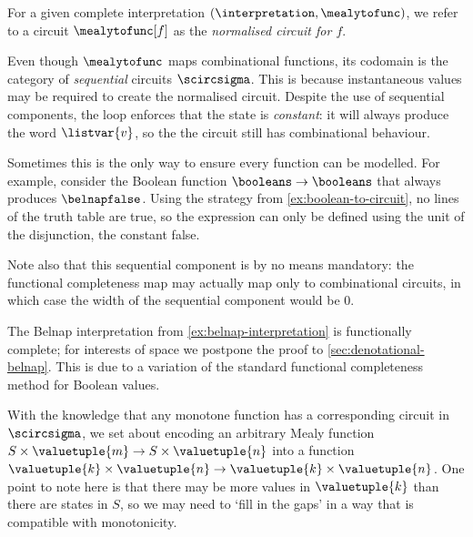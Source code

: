 For a given complete interpretation \((\interpretation,\mealytofunc)\), we refer
to a circuit \(\mealytofunc[f]\) as the \emph{normalised circuit for \(f\)}.\

\begin{remark}
    Even though \(\mealytofunc\) maps combinational functions, its codomain is
    the category of \emph{sequential} circuits \(\scircsigma\).
    This is because instantaneous values may be required to create the
    normalised circuit.
    Despite the use of sequential components, the loop enforces that the state
    is \emph{constant}: it will always produce the word \(\listvar{v}\), so the
    the circuit still has combinational behaviour.

    Sometimes this is the only way to ensure every function can be modelled.
    For example, consider the Boolean function \(\booleans \to \booleans\) that
    always produces \(\belnapfalse\).
    Using the strategy from \cref{ex:boolean-to-circuit}, no lines of the truth
    table are true, so the expression can only be defined using the unit of the
    disjunction, the constant false.

    Note also that this sequential component is by no means mandatory: the
    functional completeness map may actually map only to combinational circuits,
    in which case the width of the sequential component would be \(0\).
\end{remark}

\begin{example}
    The Belnap interpretation from \cref{ex:belnap-interpretation} is
    functionally complete; for interests of space we postpone the proof to
    \cref{sec:denotational-belnap}.
    This is due to a variation of the standard functional
    completeness method for Boolean values.
\end{example}

With the knowledge that any monotone function has a corresponding circuit
in \(\scircsigma\), we set about encoding an arbitrary Mealy function
\(S \times \valuetuple{m} \to S \times \valuetuple{n}\) into a function
\(\valuetuple{k} \times \valuetuple{n} \to \valuetuple{k} \times \valuetuple{n}\).
One point to note here is that there may be more values in \(\valuetuple{k}\)
than there are states in \(S\), so we may need to `fill in the gaps' in a way
that is compatible with monotonicity.

